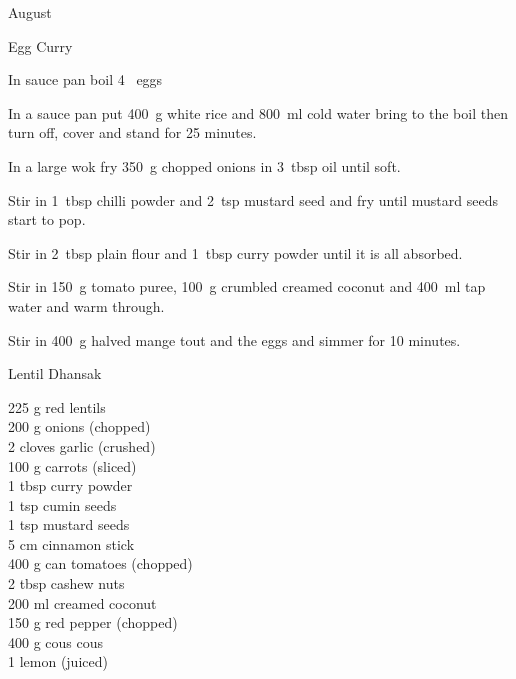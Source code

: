 \begin{menu}{August}
\begin{recipe}{2}{Egg Curry}
\begin{ingredients}
		\end{ingredients}
	
	
    \begin{instructions}
    \item 
        In sauce pan boil
        4~  eggs\item 
      In a
      sauce pan
      put
      400~g  white rice
      and
      800~ml  cold water
      bring to the boil then turn off, cover and stand for 25 minutes.
    \item 
        In a large wok fry
        350~g chopped onions
        in
        3~tbsp  oil
        until soft.
      \item 
        Stir in 1~tbsp  chilli powder
        and
        2~tsp  mustard seed
        and fry until mustard seeds start to pop.
      \item 
        Stir in
        2~tbsp  plain flour
        and
        1~tbsp  curry powder
        until it is all absorbed.
      \item 
        Stir in
        150~g  tomato puree,
        100~g crumbled creamed coconut
        and
        400~ml  tap water
        and warm through.
      \item 
        Stir in
        400~g halved mange tout
        and the eggs
        and simmer for 10 minutes.
      
    \end{instructions}
    \end{recipe}%
  
    \begin{recipe}{2}{Lentil Dhansak}%
		\begin{ingredients}
		225 g red lentils  \\
	200 g onions (chopped) \\
	2 cloves garlic (crushed) \\
	100 g carrots (sliced) \\
	1 tbsp curry powder  \\
	1 tsp cumin seeds  \\
	1 tsp mustard seeds  \\
	5 cm cinnamon stick  \\
	400 g can tomatoes (chopped) \\
	2 tbsp cashew nuts  \\
	200 ml creamed coconut  \\
	150 g red pepper (chopped) \\
	400 g cous cous  \\
	1  lemon (juiced) \\
	

\end{ingredients}
\end{recipe}
\end{menu}
